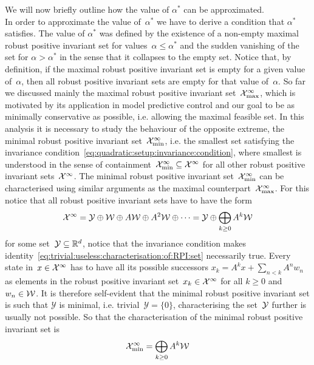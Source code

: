 %
We will now briefly outline how the value of $\alpha^\ast$ can be approximated.
%
\\[1em]
%
\mysplit In order to approximate the value of~$\alpha^\ast$ we have to derive a condition that $\alpha^\ast$ satisfies.
%
The value of $\alpha^\ast$ was defined by the existence of a non-empty maximal robust positive invariant set for values~$\alpha\leq\alpha^\ast$ and the sudden vanishing of the set for $\alpha>\alpha^\ast$ in the sense that it collapses to the empty set.
%
Notice that, by definition, if the maximal robust positive invariant set is empty for a given value of~$\alpha$, then all robust positive invariant sets are empty for that value of~$\alpha$.
%
So far we discussed mainly the maximal robust positive invariant set~$\mathcal X^\infty_{\max}$, which is motivated by its application in model predictive control and our goal to be as minimally conservative as possible, i.e. allowing the maximal feasible set.
%
In this analysis it is necessary to study the behaviour of the opposite extreme, the minimal robust positive invariant set~$\mathcal X_{\min}^\infty$, i.e. the smallest set satisfying the invariance condition~\eqref{eq:quadratic:setup:invariance:condition}, where smallest is understood in the sense of containment~$\mathcal X^\infty_{\min}\subseteq\mathcal X^\infty$ for all other robust positive invariant sets~$\mathcal X^\infty$.
%
The minimal robust positive invariant set~$\mathcal X^\infty_{\min}$ can be characterised using similar arguments as the maximal counterpart~$\mathcal X^\infty_{\max}$.
%
For this notice that all robust positive invariant sets have to have the form
%
\begin{equation}\label{eq:trivial:useless:characterisation:of:RPI:set}
		\mathcal X^\infty = \mathcal Y\oplus\mathcal W\oplus A\mathcal W\oplus A^2\mathcal W\oplus\dots = \mathcal Y\oplus\bigoplus_{k\geq0}A^k\mathcal W
\end{equation}
%
for some set~$\mathcal Y\subseteq\mathbb R^d$, notice that the invariance condition makes identity~\eqref{eq:trivial:useless:characterisation:of:RPI:set} necessarily true.
%
Every state in~$x\in\mathcal X^\infty$ has to have all its possible successors $x_k = A^kx+ \sum_{n<k}A^nw_n$ as elements in the robust positive invariant set~$x_k\in\mathcal X^\infty$ for all $k\geq0$ and $w_n\in\mathcal W$.
%
It is therefore self-evident that the minimal robust positive invariant set is such that $\mathcal Y$ is minimal, i.e. trivial~$\mathcal Y = \{0\}$, characterising the set~$\mathcal Y$ further is usually not possible.
%
So that the characterisation of the minimal robust positive invariant set is
%
\begin{equation}\label{eq:definition:minimal:RPI:set}
	\mathcal X^\infty_{\min} = \bigoplus_{k\geq0}A^k\mathcal W
\end{equation}
